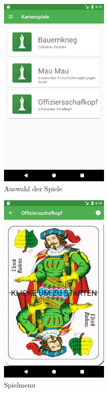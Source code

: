 \begin{figure}[h]
	\centering
	\includegraphics{resources/kartenscreens/auswahl}
	\caption{Auswahl der Spiele}
	\label{fig:cardgame_selection}
\end{figure}

\begin{figure}[h]
	\centering
	\includegraphics{resources/kartenscreens/menu}
	\caption{Spielmenu}
	\label{fig:cardgame_menu}
\end{figure}

